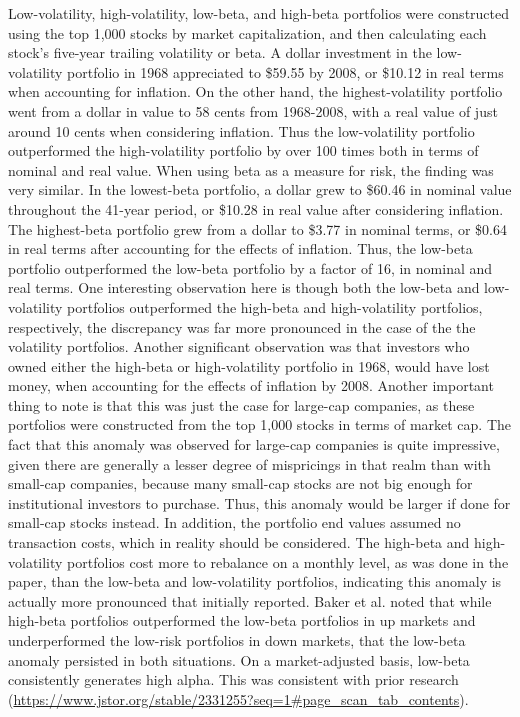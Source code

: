 \documentclass[12pt,twoside]{reedthesis}
\theoremstyle{definition}
\theoremstyle{definition}
\theoremstyle{definition}
\theoremstyle{remark}
\begin{document}
Low-volatility, high-volatility, low-beta, and high-beta portfolios were
constructed using the top 1,000 stocks by market capitalization, and
then calculating each stock's five-year trailing volatility or beta. A
dollar investment in the low-volatility portfolio in 1968 appreciated to
\$59.55 by 2008, or \$10.12 in real terms when accounting for inflation.
On the other hand, the highest-volatility portfolio went from a dollar
in value to 58 cents from 1968-2008, with a real value of just around 10
cents when considering inflation. Thus the low-volatility portfolio
outperformed the high-volatility portfolio by over 100 times both in
terms of nominal and real value. When using beta as a measure for risk,
the finding was very similar. In the lowest-beta portfolio, a dollar
grew to \$60.46 in nominal value throughout the 41-year period, or
\$10.28 in real value after considering inflation. The highest-beta
portfolio grew from a dollar to \$3.77 in nominal terms, or \$0.64 in
real terms after accounting for the effects of inflation. Thus, the
low-beta portfolio outperformed the low-beta portfolio by a factor of
16, in nominal and real terms. One interesting observation here is
though both the low-beta and low-volatility portfolios outperformed the
high-beta and high-volatility portfolios, respectively, the discrepancy
was far more pronounced in the case of the the volatility portfolios.
Another significant observation was that investors who owned either the
high-beta or high-volatility portfolio in 1968, would have lost money,
when accounting for the effects of inflation by 2008. Another important
thing to note is that this was just the case for large-cap companies, as
these portfolios were constructed from the top 1,000 stocks in terms of
market cap. The fact that this anomaly was observed for large-cap
companies is quite impressive, given there are generally a lesser degree
of mispricings in that realm than with small-cap companies, because many
small-cap stocks are not big enough for institutional investors to
purchase. Thus, this anomaly would be larger if done for small-cap
stocks instead. In addition, the portfolio end values assumed no
transaction costs, which in reality should be considered. The high-beta
and high-volatility portfolios cost more to rebalance on a monthly
level, as was done in the paper, than the low-beta and low-volatility
portfolios, indicating this anomaly is actually more pronounced that
initially reported. Baker et al. noted that while high-beta portfolios
outperformed the low-beta portfolios in up markets and underperformed
the low-risk portfolios in down markets, that the low-beta anomaly
persisted in both situations. On a market-adjusted basis, low-beta
consistently generates high alpha. This was consistent with prior
research
(\url{https://www.jstor.org/stable/2331255?seq=1\#page_scan_tab_contents}).
\end{document}
